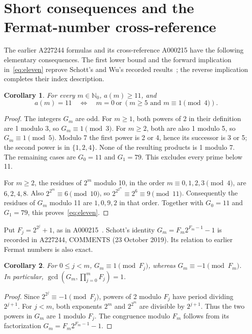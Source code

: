 \documentclass[11pt]{article}
\newtheorem{corollary}{Corollary}
\newcommand{\N}{\mathbb{N}_0}
\begin{document}
\section{Short consequences and the Fermat-number cross-reference}
The earlier A227244 formulas and its cross-reference A000215 have the
following elementary consequences. The first lower bound and the forward
implication in~\eqref{eq:eleven} reprove Schott's and Wu's recorded
results~\cite{oeis}; the reverse implication completes their index description.

\begin{corollary}\label{cor:eleven}
For every $m\in\N$, $a(m)\geq11$, and
\begin{equation}\label{eq:eleven}
 a(m)=11\quad\Longleftrightarrow\quad
 m=0\ \text{or}\ (m\geq5\text{ and }m\equiv1\pmod4).
\end{equation}
\end{corollary}
\begin{proof}
The integers $G_m$ are odd. For $m\geq1$, both powers of 2 in their
definition are 1 modulo 3, so $G_m\equiv1\pmod3$.
For $m\geq2$, both are also 1 modulo 5, so $G_m\equiv1\pmod5$.
Modulo 7 the first power is 2 or 4, hence its successor is 3 or 5;
the second power is in $\{1,2,4\}$. None of the resulting products is
1 modulo 7. The remaining cases are $G_0=11$ and $G_1=79$.
This excludes every prime below 11.

For $m\geq2$, the residues of $2^m$ modulo 10, in the order
$m\equiv0,1,2,3\pmod4$, are $6,2,4,8$. Also
$2^{2^m}\equiv6\pmod{10}$, so
$2^{2^{2^m}}\equiv2^6\equiv9\pmod{11}$.
Consequently the residues of $G_m$ modulo 11 are $1,0,9,2$ in that order.
Together with $G_0=11$ and $G_1=79$, this proves~\eqref{eq:eleven}.
\end{proof}

Put $F_j=2^{2^j}+1$, as in A000215~\cite{fermat}.
Schott's identity $G_m=F_m2^{F_m-1}-1$ is recorded in A227244, COMMENTS
(23 October 2019). Its relation to earlier Fermat numbers is also exact.
\begin{corollary}\label{cor:coprime}
For $0\leq j<m$, $G_m\equiv1\pmod{F_j}$, whereas
$G_m\equiv-1\pmod{F_m}$. In particular,
$\gcd(G_m,\prod_{j=0}^mF_j)=1$.
\end{corollary}
\begin{proof}
Since $2^{2^j}\equiv-1\pmod{F_j}$, powers of 2 modulo $F_j$ have
period dividing $2^{j+1}$. For $j<m$, both exponents $2^m$ and
$2^{2^m}$ are divisible by $2^{j+1}$. Thus the two powers in $G_m$
are 1 modulo $F_j$. The congruence modulo $F_m$ follows from its
factorization $G_m=F_m2^{F_m-1}-1$.
\end{proof}
\end{document}
